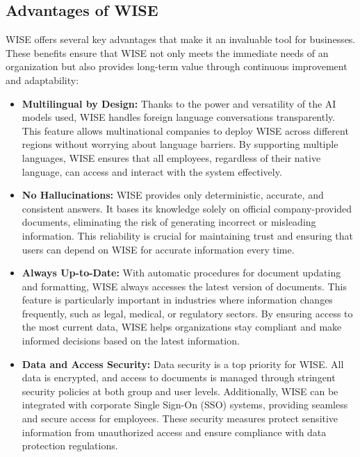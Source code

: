 \subsection{Advantages of WISE}

WISE offers several key advantages that make it an invaluable tool for businesses. These benefits ensure that WISE not only meets the immediate needs of an organization but also provides long-term value through continuous improvement and adaptability:

\begin{itemize}
    \item \textbf{Multilingual by Design:} Thanks to the power and versatility of the AI models used, WISE handles foreign language conversations transparently. This feature allows multinational companies to deploy WISE across different regions without worrying about language barriers. By supporting multiple languages, WISE ensures that all employees, regardless of their native language, can access and interact with the system effectively.
    
    \item \textbf{No Hallucinations:} WISE provides only deterministic, accurate, and consistent answers. It bases its knowledge solely on official company-provided documents, eliminating the risk of generating incorrect or misleading information. This reliability is crucial for maintaining trust and ensuring that users can depend on WISE for accurate information every time.
    
    \item \textbf{Always Up-to-Date:} With automatic procedures for document updating and formatting, WISE always accesses the latest version of documents. This feature is particularly important in industries where information changes frequently, such as legal, medical, or regulatory sectors. By ensuring access to the most current data, WISE helps organizations stay compliant and make informed decisions based on the latest information.
    
    \item \textbf{Data and Access Security:} Data security is a top priority for WISE. All data is encrypted, and access to documents is managed through stringent security policies at both group and user levels. Additionally, WISE can be integrated with corporate Single Sign-On (SSO) systems, providing seamless and secure access for employees. These security measures protect sensitive information from unauthorized access and ensure compliance with data protection regulations.
    

\end{itemize}
